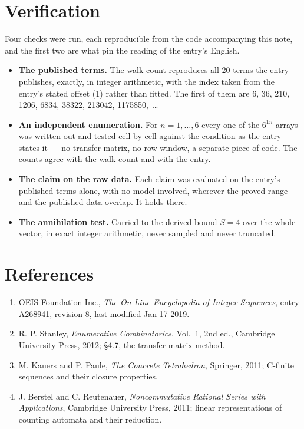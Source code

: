 \documentclass[11pt]{article}
\theoremstyle{definition}
\begin{document}
\section{Verification}

Four checks were run, each reproducible from the code accompanying this note, and the first two are what pin the reading of the entry's English.

\begin{itemize}

\item {\bfseries The published terms.} The walk count reproduces all 20 terms the entry publishes, exactly, in integer arithmetic, with the index taken from the entry's stated offset (1) rather than fitted. The first of them are 6, 36, 210, 1206, 6834, 38322, 213042, 1175850,~\dots

\item {\bfseries An independent enumeration.} For $n = 1,\dots,6$ every one of the $6^{1n}$ arrays was written out and tested cell by cell against the condition as the entry states it --- no transfer matrix, no row window, a separate piece of code. The counts agree with the walk count and with the entry.

\item {\bfseries The claim on the raw data.} Each claim was evaluated on the entry's published terms alone, with no model involved, wherever the proved range and the published data overlap. It holds there.

\item {\bfseries The annihilation test.} Carried to the derived bound $S = 4$ over the whole vector, in exact integer arithmetic, never sampled and never truncated.

\end{itemize}

\section{References}

\begin{enumerate}

\item OEIS Foundation Inc., \emph{The On-Line Encyclopedia of Integer Sequences}, entry \href{https://oeis.org/A268941}{A268941}, revision 8, last modified Jan 17 2019.

\item R. P. Stanley, \emph{Enumerative Combinatorics}, Vol.~1, 2nd ed., Cambridge University Press, 2012; \S4.7, the transfer-matrix method.

\item M. Kauers and P. Paule, \emph{The Concrete Tetrahedron}, Springer, 2011; C-finite sequences and their closure properties.

\item J. Berstel and C. Reutenauer, \emph{Noncommutative Rational Series with Applications}, Cambridge University Press, 2011; linear representations of counting automata and their reduction.

\end{enumerate}
\end{document}
